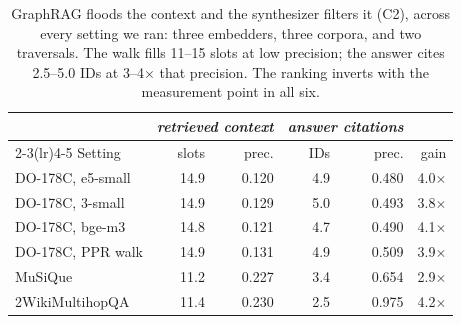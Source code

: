 \begin{table}[t]
  \centering
  \caption{GraphRAG floods the context and the synthesizer filters it (C2), across every setting we ran: three embedders, three corpora, and two traversals. The walk fills 11--15 slots at low precision; the answer cites 2.5--5.0 IDs at 3--4$\times$ that precision. The ranking inverts with the measurement point in all six.}
  \label{tab:pathology}
  \small
  \setlength{\tabcolsep}{4pt}
  \begin{tabular}{l rr rr r}
    \toprule
    & \multicolumn{2}{c}{\textit{retrieved context}} & \multicolumn{2}{c}{\textit{answer citations}} & \\
    \cmidrule(lr){2-3}\cmidrule(lr){4-5}
    Setting & slots & prec. & IDs & prec. & gain \\
    \midrule
    DO-178C, e5-small     & 14.9 & 0.120 & 4.9 & 0.480 & 4.0$\times$ \\
    DO-178C, 3-small      & 14.9 & 0.129 & 5.0 & 0.493 & 3.8$\times$ \\
    DO-178C, bge-m3       & 14.8 & 0.121 & 4.7 & 0.490 & 4.1$\times$ \\
    DO-178C, PPR walk     & 14.9 & 0.131 & 4.9 & 0.509 & 3.9$\times$ \\
    MuSiQue               & 11.2 & 0.227 & 3.4 & 0.654 & 2.9$\times$ \\
    2WikiMultihopQA       & 11.4 & 0.230 & 2.5 & 0.975 & 4.2$\times$ \\
    \bottomrule
  \end{tabular}
\end{table}
